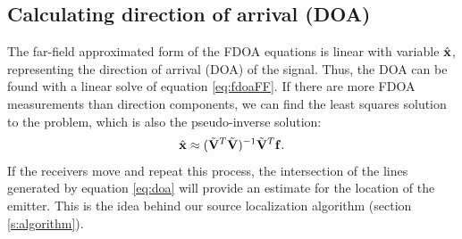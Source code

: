 
\subsection{Calculating direction of arrival (DOA)}
The far-field approximated form of the FDOA equations is linear with variable $\hat{\mathbf{x}}$, representing the direction of arrival (DOA) of the signal. Thus, the DOA can be found with a linear solve of equation \ref{eq:fdoaFF}. If there are more FDOA measurements than direction components, we can find the least squares solution to the problem, which is also the pseudo-inverse solution:
\begin{align}
  \label{eq:doa}
\hat{\mathbf{x}} \approx (\tilde{\mathbf{V}}^T\tilde{\mathbf{V}})^{-1}\tilde{\mathbf{V}}^T\mathbf{f}.
\end{align}
If the receivers move and repeat this process, the intersection of the lines generated by equation \ref{eq:doa} will provide an estimate for the location of the emitter. This is the idea behind our source localization algorithm (section \ref{s:algorithm}).
